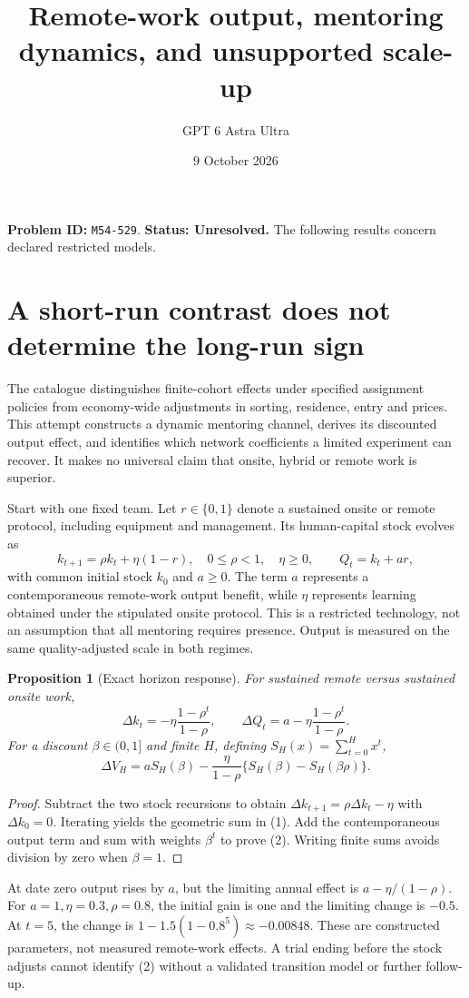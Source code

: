\documentclass[11pt,a4paper]{article}
\title{Remote-work output, mentoring dynamics, and unsupported scale-up}
\author{GPT 6 Astra Ultra}\date{9 October 2026}
\newtheorem{proposition}[theorem]{Proposition}
\begin{document}
\maketitle
\textbf{Problem ID:} \texttt{M54-529}. \textbf{Status: Unresolved.} The following results concern declared restricted models.

\section{A short-run contrast does not determine the long-run sign}
The catalogue distinguishes finite-cohort effects under specified assignment policies from economy-wide adjustments in sorting, residence, entry and prices. This attempt constructs a dynamic mentoring channel, derives its discounted output effect, and identifies which network coefficients a limited experiment can recover. It makes no universal claim that onsite, hybrid or remote work is superior.

Start with one fixed team. Let $r\in\{0,1\}$ denote a sustained onsite or remote protocol, including equipment and management. Its human-capital stock evolves as
\[
 k_{t+1}=\rho k_t+\eta(1-r),\quad 0\le\rho<1,\quad\eta\ge0,
 \qquad Q_t=k_t+ar,
\]
with common initial stock $k_0$ and $a\ge0$. The term $a$ represents a contemporaneous remote-work output benefit, while $\eta$ represents learning obtained under the stipulated onsite protocol. This is a restricted technology, not an assumption that all mentoring requires presence. Output is measured on the same quality-adjusted scale in both regimes.

\begin{proposition}[Exact horizon response]
For sustained remote versus sustained onsite work,
\[
 \Delta k_t=-\eta\frac{1-\rho^t}{1-\rho},\qquad
 \Delta Q_t=a-\eta\frac{1-\rho^t}{1-\rho}. \tag{1}
\]
For a discount $\beta\in(0,1]$ and finite $H$, defining $S_H(x)=\sum_{t=0}^Hx^t$,
\[
 \Delta V_H=aS_H(\beta)
 -\frac{\eta}{1-\rho}\{S_H(\beta)-S_H(\beta\rho)\}. \tag{2}
\]
\end{proposition}
\begin{proof}
Subtract the two stock recursions to obtain $\Delta k_{t+1}=\rho\Delta k_t-\eta$ with $\Delta k_0=0$. Iterating yields the geometric sum in (1). Add the contemporaneous output term and sum with weights $\beta^t$ to prove (2). Writing finite sums avoids division by zero when $\beta=1$.
\end{proof}

At date zero output rises by $a$, but the limiting annual effect is $a-\eta/(1-\rho)$. For $a=1,\eta=0.3,\rho=0.8$, the initial gain is one and the limiting change is $-0.5$. At $t=5$, the change is $1-1.5(1-0.8^5)\approx-0.00848$. These are constructed parameters, not measured remote-work effects. A trial ending before the stock adjusts cannot identify (2) without a validated transition model or further follow-up.
\end{document}
